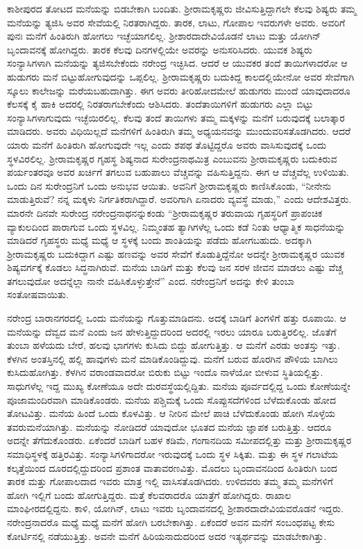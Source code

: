 ಕಾಶೀಪುರದ ತೋಟದ ಮನೆಯನ್ನು ಬಿಡಬೇಕಾಗಿ ಬಂದಿತು. ಶ‍್ರೀರಾಮಕೃಷ್ಣರು ಜೀವಿಸುತ್ತಿದ್ದಾಗಲೇ ಕೆಲವು ಶಿಷ್ಯರು ತಮ್ಮ ಮನೆಯನ್ನು ತ್ಯಜಿಸಿ ಅವರ ಸೇವೆಯಲ್ಲಿ ನಿರತರಾಗಿದ್ದರು. ತಾರಕ, ಲಾಟು, ಗೋಪಾಲ ಇವರುಗಳೇ ಅವರು. ಅವರಿಗೆ ಪುನಃ ಮನೆಗೆ ಹಿಂತಿರುಗಿ ಹೋಗಲು ಇಚ್ಛೆಯಾಗಲಿಲ್ಲ. ಶ‍್ರೀಶಾರದಾದೇವಿಯೊಡನೆ ಲಾಟು ಮತ್ತು ಯೋಗಿನ್ ಬೃಂದಾವನಕ್ಕೆ ಹೋಗಿದ್ದರು. ತಾರಕ ಕೆಲವು ದಿನಗಳಲ್ಲಿಯೇ ಅವರನ್ನು ಅನುಸರಿಸಿದರು. ಯುವಕ ಶಿಷ್ಯರು ಸಂನ್ಯಾಸಿಗಳಾಗಿ ಮನೆಯನ್ನು ತ್ಯಜಿಸಬೇಕೆಂದು ನರೇಂದ್ರ ಇಚ್ಛಿಸಿದ. ಆದರೆ ಆ ಯುವಕರ ತಂದೆ ತಾಯಿಗಳಾದರೋ ಆ ಹುಡುಗರು ಮನೆ ಬಿಟ್ಟುಹೋಗುವುದನ್ನು ಒಪ್ಪಲಿಲ್ಲ. ಶ‍್ರೀರಾಮಕೃಷ್ಣರು ಬದುಕಿದ್ದ ಕಾಲದಲ್ಲಿಯೇನೋ ಅವರ ಸೇವೆಗಾಗಿ ಸ್ಕೂಲು ಕಾಲೇಜನ್ನು ಮರೆಯಬಹುದಾಗಿತ್ತು. ಈಗ ಅವರು ತೀರಿಹೋದಮೇಲೆ ಹುಡುಗರು ಮುಂದೆ ಯಾವುದಾದರೂ ಕೆಲಸಕ್ಕೆ ಕೈ ಹಾಕಿ ಅದರಲ್ಲಿ ನಿರತರಾಗಬೇಕೆಂದು ಆಶಿಸಿದರು. ತಂದೆತಾಯಿಗಳಿಗೆ ಹುಡುಗರು ಎಲ್ಲಾ ಬಿಟ್ಟು ಸಂನ್ಯಾಸಿಗಳಾಗುವುದು ಇಚ್ಛೆಯಿರಲಿಲ್ಲ. ಕೆಲವು ತಂದೆ ತಾಯಿಗಳು ತಮ್ಮ ಮಕ್ಕಳನ್ನು ಮನೆಗೆ ಬರುವುದಕ್ಕೆ ಬಲಾತ್ಕಾರ ಮಾಡಿದರು. ಅವರು ವಿಧಿಯಿಲ್ಲದೆ ಮನೆಗಳಿಗೆ ಹಿಂತಿರುಗಿ ತಮ್ಮ ಅಧ್ಯಯನವನ್ನು ಮುಂದುವರಿಸತೊಡಗಿದರು. ಆದರೆ ಯಾರು ಮನೆಗೆ ಹಿಂತಿರುಗಿ ಹೋಗುವುದೇ ಇಲ್ಲ ಎಂದು ಶಪಥ ತೊಟ್ಟಿದ್ದರೊ ಅವರು ವಾಸಿಸುವುದಕ್ಕೆ ಒಂದು ಸ್ಥಳವಿರಲಿಲ್ಲ. ಶ‍್ರೀರಾಮಕೃಷ್ಣರ ಗೃಹಸ್ಥ ಶಿಷ್ಯನಾದ ಸುರೇಂದ್ರನಾಥಮಿತ್ರ ಎಂಬುವನು ಶ‍್ರೀರಾಮಕೃಷ್ಣರು ಬದುಕಿರುವ ಪರ್ಯಂತರವೂ ಅವರ ಖರ್ಚಿಗೆ ತಗಲುವ ಬಹುಪಾಲು ವೆಚ್ಚವನ್ನು ವಹಿಸುತ್ತಿದ್ದನು. ಈಗ ಆ ವೆಚ್ಚವೆಲ್ಲ ಉಳಿಯಿತು. ಒಂದು ದಿನ ಸುರೇಂದ್ರನಿಗೆ ಒಂದು ಅನುಭವ ಆಯಿತು. ಅವನಿಗೆ ಶ‍್ರೀರಾಮಕೃಷ್ಣರು ಕಾಣಿಸಿಕೊಂಡು, “ನೀನೇನು ಮಾಡುತ್ತಿರುವೆ? ನನ್ನ ಮಕ್ಕಳು ನಿರ್ಗತಿಕರಾಗಿದ್ದಾರೆ. ಅವರಿಗಾಗಿ ಏನಾದರು ವ್ಯವಸ್ಥೆ ಮಾಡು,” ಎಂದು ಆದೇಶವಿತ್ತರು. ಮಾರನೇ ದಿನವೇ ಸುರೇಂದ್ರ ನರೇಂದ್ರನಾಥನನ್ನು\break ಕಂಡು “ಶ‍್ರೀರಾಮಕೃಷ್ಣರ ತರುವಾಯ ಗೃಹಸ್ಥರಿಗೆ ಪ್ರಾಪಂಚಿಕ ವ್ಯಾಕುಲದಿಂದ ಪಾರಾಗುವ ಒಂದು ಸ್ಥಳವಿಲ್ಲ. ನಿಮ್ಮಂತಹ ತ್ಯಾಗಿಗಳೆಲ್ಲ ಒಂದು ಕಡೆ ನಿಂತು ಆಧ್ಯಾತ್ಮಿಕ ಸಾಧನೆಯನ್ನು ಮಾಡಿದರೆ ಗೃಹಸ್ಥರು ಮಧ್ಯೆ ಮಧ್ಯೆ ಆ ಸ್ಥಳಕ್ಕೆ ಬಂದು ಶಾಂತಿಯನ್ನು ಪಡೆದು ಹೋಗಬಹುದು. ಅದಕ್ಕಾಗಿ ಶ‍್ರೀರಾಮಕೃಷ್ಣರು ಬದುಕಿದ್ದಾಗ ಎಷ್ಟು ಹಣವನ್ನು ಅವರ ಸೇವೆಗೆ ಕೊಡುತ್ತಿದ್ದೆನೋ ಅದನ್ನೇ ಶ‍್ರೀರಾಮಕೃಷ್ಣರ ಯುವಕ ಶಿಷ್ಯವರ್ಗಕ್ಕೆ ಕೊಡಲು ಸಿದ್ಧನಾಗಿರುವೆ. ಮನೆಯ ಬಾಡಿಗೆ ಮತ್ತು ಕೆಲವು ಜನ ಸರಳ ಜೀವನ ಮಾಡಲು ಎಷ್ಟು ವೆಚ್ಚ ತಗಲುವುದೋ ಅದನ್ನೆಲ್ಲಾ ನಾನೇ ವಹಿಸಿಕೊಳ್ಳುತ್ತೇನೆ” ಎಂದ. ನರೇಂದ್ರನಿಗೆ ಅದನ್ನು ಕೇಳಿ ತುಂಬಾ ಸಂತೋಷವಾಯಿತು.

ನರೇಂದ್ರ ಬಾರಾನಗರದಲ್ಲಿ ಒಂದು ಮನೆಯನ್ನು ಗೊತ್ತುಮಾಡಿದನು. ಅದಕ್ಕೆ ಬಾಡಿಗೆ ತಿಂಗಳಿಗೆ ಹತ್ತು ರೂಪಾಯಿ. ಆ ಮನೆಯನ್ನು ದೆವ್ವದ ಮನೆ ಎಂದು ಜನ ಹೇಳುತ್ತಿದ್ದುದರಿಂದ ಅದರಲ್ಲಿ ಇರಲು ಯಾರೂ ಬರುತ್ತಿರಲಿಲ್ಲ. ಜೊತೆಗೆ ತುಂಬಾ ಹಳೆಯದು ಬೇರೆ, ಹಲವು ಭಾಗಗಳು ಕುಸಿದು ಬಿದ್ದು ಹೋಗುತ್ತಿತ್ತು. ಆ ಮನೆಗೆ ಎರಡು ಅಂತಸ್ತು ಇತ್ತು. ಕೆಳಗಿನ ಅಂತಸ್ತಿನಲ್ಲಿ ಹಲ್ಲಿ ಹಾವುಗಳು ಮನೆ ಮಾಡಿಕೊಂಡಿದ್ದುವು. ಮನೆಗೆ ಬರುವ ಹೊರಗಿನ ಪೌಳಿಯ ಬಾಗಿಲು ಕುಸಿದುಹೋಗಿತ್ತು. ಕೆಳಗಿನ ವರಾಂಡವಾದರೋ ಬಿರುಕು ಬಿಟ್ಟು ಇಂದೊ ನಾಳೆಯೋ ಬೀಳುವ ಸ್ಥಿತಿಯಲ್ಲಿತ್ತು. ಸಾಧುಗಳೆಲ್ಲ ಇದ್ದ ಮುಖ್ಯ ಕೋಣೆಯೂ ಅದೇ ದುರವಸ್ಥೆಯಲ್ಲಿದ್ದಿತು. ಮನೆಯ ಪೂರ್ವದಲ್ಲಿದ್ದ ಒಂದು ಕೋಣೆಯನ್ನೇ ಪೂಜಾಮಂದಿರವಾಗಿ ಮಾಡಿಕೊಂಡರು. ಮನೆಯ ಪಶ್ಚಿಮಕ್ಕೆ ಒಂದು ಸೊಪ್ಪುಸದೆಗಳಿಂದ ಬೆಳೆದುಕೊಂಡು ಹೋದ ತೋಟವಿತ್ತು. ಮನೆಯ ಹಿಂದೆ ಒಂದು ಕೊಳವಿತ್ತು. ಆ ನೀರಿನ ಮೇಲೆ ಪಾಚಿ ಬೆಳೆದುಕೊಂಡು ಹೋಗಿ ಸೊಳ್ಳೆಯ ತವರುಮನೆಯಾಗಿತ್ತು. ಮನೆಯನ್ನು ನೋಡಿದರೆ ಯಾವುದೋ ಭೂತದ ಮನೆಯ ಜ್ಞಾಪಕ ಬರುತ್ತಿತ್ತು. ಆದರೂ ಅದನ್ನೇ ತೆಗೆದುಕೊಂಡರು. ಏಕೆಂದರೆ ಬಾಡಿಗೆ ಬಹಳ ಕಡಿಮೆ, ಗಂಗಾನದಿಯ ಸಮೀಪದಲ್ಲಿತ್ತು ಮತ್ತು ಶ‍್ರೀರಾಮಕೃಷ್ಣರ ಸಮಾಧಿಸ್ಥಳಕ್ಕೆ ಹತ್ತಿರವಿತ್ತು. ಸಂನ್ಯಾಸಿಗಳಿಗಾದರೋ ಇರುವುದಕ್ಕೆ ಒಂದು ಸ್ಥಳ ಸಿಕ್ಕಿತು. ಮತ್ತು ಈ ಸ್ಥಳ ಗಲಾಟೆಯ ಕಲ್ಕತ್ತೆಯಿಂದ ದೂರದಲ್ಲಿದ್ದುದರಿಂದ ಪ್ರಶಾಂತ ವಾತಾವರಣವಿತ್ತು. ಮೊದಲು ಬೃಂದಾವನದಿಂದ ಹಿಂತಿರುಗಿ ಬಂದ ತಾರಕ ಮತ್ತು ಗೋಪಾಲದಾದ ಇವರು ಮಾತ್ರ ಇಲ್ಲಿ ವಾಸಿಸತೊಡಗಿದರು. ಉಳಿದವರು ತಮ್ಮ ತಮ್ಮ ಮನೆಗಳಿಗೆ ಹೋಗಿ ಇಲ್ಲಿಗೆ ಬಂದು ಹೋಗುತ್ತಿದ್ದರು. ಮತ್ತೆ ಕೆಲವರಾದರೊ ಯಾತ್ರೆಗೆ ಹೋಗಿದ್ದರು. ರಾಖಾಲ ಮಾಂಘೀರದಲ್ಲಿದ್ದನು. ಕಾಳಿ, ಯೋಗಿನ್, ಲಾಟು ಇವರು ಬೃಂದಾವನದಲ್ಲಿ ಶ‍್ರೀಶಾರದಾದೇವಿಯವರೊಡನೆ ಇದ್ದರು. ನರೇಂದ್ರನಾದರೊ ಮಧ್ಯೆ ಮಧ್ಯೆ ಮನೆಗೆ ಹೋಗಿ ಬರಬೇಕಾಗಿತ್ತು. ಏಕೆಂದರೆ ಅವನ ಮನೆಗೆ ಸಂಬಂಧಪಟ್ಟ ಕೇಸು ಕೋರ್ಟಿನಲ್ಲಿ ನಡೆಯುತ್ತಿತ್ತು. ಅವನೇ ಮನೆಗೆ ಹಿರಿಯನಾದುದರಿಂದ ಅದರ ಇತ್ಯರ್ಥವನ್ನು ಮಾಡಬೇಕಾಗಿತ್ತು.

